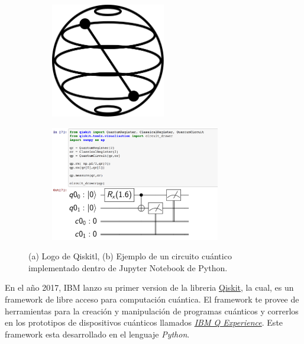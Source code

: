 \begin{figure}[H]
    \begin{subfigure}{0.5\textwidth}
        \centering
        \caption{}
    \includegraphics[height=5cm]{images/Qiskit.png}
    \label{fig:logo_qiskit}
    \end{subfigure}
    \begin{subfigure}{0.5\textwidth}
        \centering
        \caption{}
    \includegraphics[height=5cm]{images/Example_qiskit.png}
    \label{fig:example_qiskit}
    \end{subfigure}
    \caption{(a) Logo de Qiskitl, (b) Ejemplo de un circuito cuántico implementado dentro de Jupyter Notebook de Python.}
\end{figure}
En el año 2017, IBM lanzo su primer version de la libreria \href{https://qiskit.org/}{Qiskit}, la cual, es un framework de libre acceso para computación cuántica. El framework te provee de herramientas para la creación y manipulación de programas cuánticos
y correrlos en los prototipos de dispositivos cuánticos llamados \href{https://quantum-computing.ibm.com/}{\textit{IBM Q Experience}}. Este framework esta desarrollado en el lenguaje \textit{Python}. 